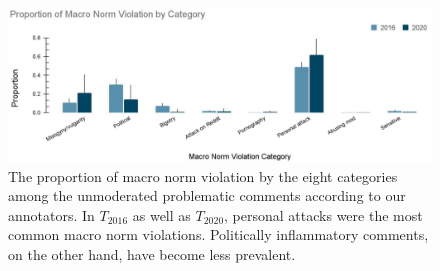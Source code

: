 \begin{figure}[tb]
  \centering
  \includegraphics[width=1\textwidth]{content_minor_revision__Apr2022/images/macro_norm_violation_fixed_2.jpg}
  \caption{The proportion of macro norm violation by the eight categories among the unmoderated problematic comments according to our annotators. In $T_{2016}$ as well as $T_{2020}$, personal attacks were the most common macro norm violations. Politically inflammatory comments, on the other hand, have become less prevalent.}
\end{figure}
